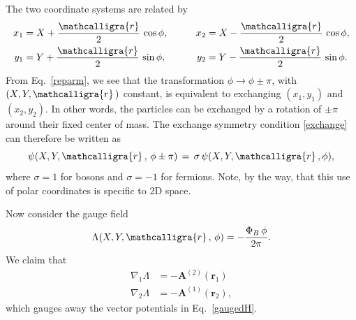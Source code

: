 \documentclass[prx,12pt]{revtex4-2}
\begin{document}
\noindent
The two coordinate systems are related by
\begin{align}
  \begin{aligned}
    x_1 &= X + \frac{\mathcalligra{r}}{2} \,\cos\phi, \qquad
    & x_2 &= X - \frac{\mathcalligra{r}}{2} \,\cos\phi, \\
    y_1 &= Y + \frac{\mathcalligra{r}}{2} \,\sin\phi,
    & y_2 &= Y - \frac{\mathcalligra{r}}{2} \,\sin\phi.
  \end{aligned}
  \label{reparm}
\end{align}
From Eq.~\eqref{reparm}, we see that the transformation $\phi
\rightarrow \phi \pm \pi$, with $(X, Y, \mathcalligra{r}\,)$ constant,
is equivalent to exchanging $(x_1,y_1)$ and $(x_2,y_2)$.  In other
words, the particles can be exchanged by a rotation of $\pm \pi$
around their fixed center of mass.  The exchange symmetry condition
\eqref{exchange} can therefore be written as
\begin{equation}
  \psi(X, Y, \mathcalligra{r}\,,\, \phi \pm \pi) \,=\, \sigma \, \psi(X,
  Y, \mathcalligra{r}\,, \phi),
  \label{exchange2}
\end{equation}
where $\sigma = 1$ for bosons and $\sigma = -1$ for fermions.  Note,
by the way, that this use of polar coordinates is specific to 2D
space.

Now consider the gauge field
\begin{equation}
  \Lambda(X, Y, \mathcalligra{r}\,,\, \phi) = -\frac{\Phi_B \,\phi}{2\pi}.
  \label{Lambda}
\end{equation}
We claim that
\begin{align}
  \nabla_1 \Lambda &= - \mathbf{A}^{(2)}(\mathbf{r}_1) \label{nabla1} \\
  \nabla_2 \Lambda &= - \mathbf{A}^{(1)}(\mathbf{r}_2), \label{nabla2}
\end{align}
which gauges away the vector potentials in Eq.~\eqref{gaugedH}.
\end{document}
